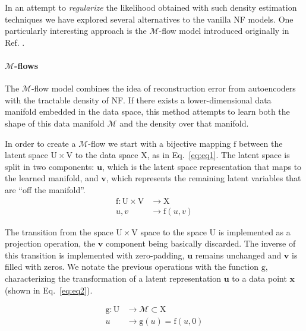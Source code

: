 \documentclass[a4paper,11pt]{article}
\begin{document}
In an attempt to \textit{regularize} the likelihood obtained with such density estimation techniques we have explored several alternatives to the vanilla NF models. One particularly interesting approach is the $\mathcal{M}$-flow model introduced originally in Ref. \cite{Brehmer:2020vwc}. 

\paragraph{$\mathcal{M}$-flows}

The $\mathcal{M}$-flow model combines the idea of reconstruction error from autoencoders with the tractable density of NF. If there exists a lower-dimensional  data manifold embedded in the data space, this method attempts to learn both the shape of this data manifold $\mathcal{M}$ and the density over that manifold.

In order to create a $\mathcal{M}$-flow we start with a bijective mapping $\mathrm{f}$ between the latent space $\mathrm{U} \times \mathrm{V}$ to the data space $\mathrm{X}$, as in Eq.~\ref{eq:eq1}. The latent space is split in two components: $\mathbf{u}$, which is the latent space representation that maps to the learned manifold, and $\mathbf{v}$, which represents the remaining latent variables that are “off the manifold”. 
\begin{equation}
    \begin{split}
        \mathrm{f}: \mathrm{U} \times \mathrm{V} & \rightarrow \mathrm{X} \\ u,v &\rightarrow \mathrm{f}(u,v)
    \end{split}
    \label{eq:eq1}
\end{equation}

The transition from the space $\mathrm{U} \times \mathrm{V}$ space to the space $\mathrm{U}$ is implemented as a projection operation, the $\mathbf{v}$ component being basically discarded. The inverse of this transition is implemented with zero-padding, $\mathbf{u}$ remains unchanged and $\mathbf{v}$ is filled with zeros. We notate the previous operations with the function $\mathrm{g}$, characterizing the transformation of a latent representation $\mathbf{u}$ to a data point $\mathbf{x}$ (shown in Eq.~\ref{eq:eq2}). 

\begin{equation}
    \begin{split}
        \mathrm{g}: \mathrm{U} & \rightarrow \mathcal{M} \subset \mathrm{X} \\ 
        u &\rightarrow \mathrm{g}(u) = \mathrm{f}(u,0) 
    \end{split}
    \label{eq:eq2}
\end{equation}
\end{document}
